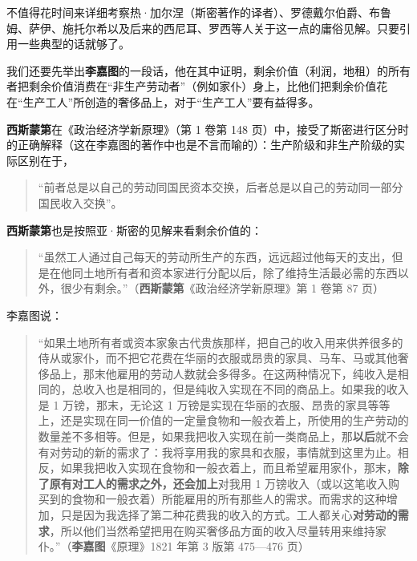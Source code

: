 

不值得花时间来详细考察热·加尔涅（斯密著作的译者）、罗德戴尔伯爵、布鲁姆、萨伊、施托尔希以及后来的西尼耳、罗西等人关于这一点的庸俗见解。只要引用一些典型的话就够了。

我们还要先举出\textbf{李嘉图}的一段话，他在其中证明，剩余价值（利润，地租）的所有者把剩余价值消费在“非生产劳动者”（例如家仆）身上，比他们把剩余价值花在“生产工人”所创造的奢侈品上，对于“生产工人”要有益得多。

\fontbox{~\{}\textbf{西斯蒙第}在《政治经济学新原理》（第 1 卷第 148 页）中，接受了斯密进行区分时的正确解释（这在李嘉图的著作中也是不言而喻的）：生产阶级和非生产阶级的实际区别在于，

\begin{quote}“前者总是以自己的劳动同国民资本交换，后者总是以自己的劳动同一部分国民收入交换”。\end{quote}

\textbf{西斯蒙第}也是按照亚·斯密的见解来看剩余价值的：

\begin{quote}“虽然工人通过自己每天的劳动所生产的东西，远远超过他每天的支出，但是在他同土地所有者和资本家进行分配以后，除了维持生活最必需的东西以外，很少有剩余。”（\textbf{西斯蒙第}《政治经济学新原理》第 1 卷第 87 页）\fontbox{\}~}\end{quote}

李嘉图说：

\begin{quote}“如果土地所有者或资本家象古代贵族那样，把自己的收入用来供养很多的侍从或家仆，而不把它花费在华丽的衣服或昂贵的家具、马车、马或其他奢侈品上，那末他雇用的劳动人数就会多得多。在这两种情况下，纯收入是相同的，总收入也是相同的，但是纯收入实现在不同的商品上。如果我的收入是 1 万镑，那末，无论这 1 万镑是实现在华丽的衣服、昂贵的家具等等上，还是实现在同一价值的一定量食物和一般衣着上，所使用的生产劳动的数量差不多相等。但是，如果我把收入实现在前一类商品上，那\textbf{以后}就不会有对劳动的新的需求了：我将享用我的家具和衣服，事情就到这里为止。相反，如果我把收入实现在食物和一般衣着上，而且希望雇用家仆，那末，\textbf{除了原有对工人的需求之外，还会加上}对我用 1 万镑收入（或以这笔收入购买到的食物和一般衣着）所能雇用的所有那些人的需求。而需求的这种增加，只是因为我选择了第二种花费我的收入的方式。工人都关心\textbf{对劳动的需求}，所以他们当然希望把用在购买奢侈品方面的收入尽量转用来维持家仆。”（\textbf{李嘉图}《原理》1821 年第 3 版第 475—476 页）\end{quote}


